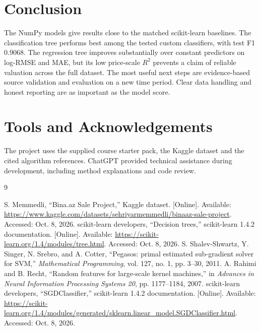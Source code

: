 \documentclass[10pt,twocolumn,a4paper]{article}
\begin{document}
\balance
\section{Conclusion}
The NumPy models give results close to the matched scikit-learn baselines. The classification tree performs best among the tested custom classifiers, with test F1 0.9068. The regression tree improves substantially over constant predictors on log-RMSE and MAE, but its low price-scale $R^2$ prevents a claim of reliable valuation across the full dataset. The most useful next steps are evidence-based source validation and evaluation on a new time period. Clear data handling and honest reporting are as important as the model score.

\section*{Tools and Acknowledgements}
The project uses the supplied course starter pack, the Kaggle dataset and the cited algorithm references. ChatGPT provided technical assistance during development, including method explanations and code review.

\begin{thebibliography}{9}
\raggedright
{}
 S. Memmedli, ``Bina.az Sale Project,'' Kaggle dataset. [Online]. Available: \url{https://www.kaggle.com/datasets/sehriyarmemmedli/binaaz-sale-project}. Accessed: Oct. 8, 2026.
 scikit-learn developers, ``Decision trees,'' scikit-learn 1.4.2 documentation. [Online]. Available: \url{https://scikit-learn.org/1.4/modules/tree.html}. Accessed: Oct. 8, 2026.
 S. Shalev-Shwartz, Y. Singer, N. Srebro, and A. Cotter, ``Pegasos: primal estimated sub-gradient solver for SVM,'' \emph{Mathematical Programming}, vol. 127, no. 1, pp. 3--30, 2011.
 A. Rahimi and B. Recht, ``Random features for large-scale kernel machines,'' in \emph{Advances in Neural Information Processing Systems 20}, pp. 1177--1184, 2007.
 scikit-learn developers, ``SGDClassifier,'' scikit-learn 1.4.2 documentation. [Online]. Available: \url{https://scikit-learn.org/1.4/modules/generated/sklearn.linear_model.SGDClassifier.html}. Accessed: Oct. 8, 2026.
\end{thebibliography}
\end{document}
